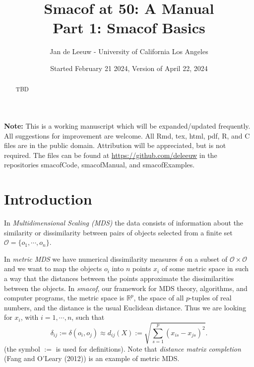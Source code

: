 \documentclass[
  12pt,
]{article}
\title{Smacof at 50: A Manual\\
Part 1: Smacof Basics}
\author{Jan de Leeuw - University of California Los Angeles}
\date{Started February 21 2024, Version of April 22, 2024}
\newcommand{\sectionbreak}{\clearpage}
\begin{document}
\maketitle
\begin{abstract}
TBD
\end{abstract}

{
\setcounter{tocdepth}{4}
\tableofcontents
}
\textbf{Note:} This is a working manuscript which will be expanded/updated
frequently. All suggestions for improvement are welcome. All Rmd, tex,
html, pdf, R, and C files are in the public domain. Attribution will be
appreciated, but is not required. The files can be found at
\url{https://github.com/deleeuw} in the repositories smacofCode, smacofManual,
and smacofExamples.

\sectionbreak

\section{Introduction}\label{introduction}

In \emph{Multidimensional Scaling (MDS)} the data consists of information
about the similarity or dissimilarity between pairs of objects selected
from a finite set \(\mathcal{O}=\{o_1,\cdots,o_n\}\).

In \emph{metric MDS} we have numerical dissimilarity measures \(\delta\) on
a subset of \(\mathcal{O}\times\mathcal{O}\) and we want to
map the objects \(o_i\) into \(n\) points \(x_i\) of some metric space in such
a way that the distances between the points approximate the
dissimilarities between the objects. In \emph{smacof}, our framework for MDS
theory, algorithms, and computer programs, the metric space is
\(\mathbb{R}^p\), the space of all \(p\)-tuples of real numbers, and the distance is the usual Euclidean distance. Thus we are looking for
\(x_i\), with \(i=1,\cdots,n\), such that
\begin{equation}
\delta_{ij}:=\delta(o_i,o_j)\approx d_{ij}(X):=\sqrt{\sum_{s=1}^p(x_{is}-x_{js})^2}.
\label{eq:mdsdef}
\end{equation}
(the symbol \(:=\) is used for definitions). Note that \emph{distance matrix completion} (Fang and O'Leary (2012)) is an example of metric MDS.
\end{document}
